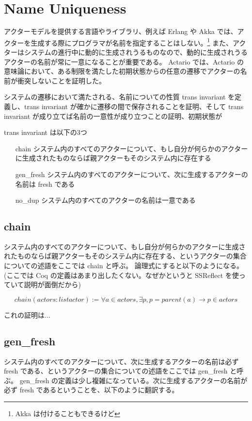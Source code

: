 \section{Name Uniqueness}
アクターモデルを提供する言語やライブラリ、例えば Erlang や Akka では、アクターを生成する際にプログラマが名前を指定することはしない。\footnote{Akka は付けることもできるけど}
また、アクターはシステムの進行中に動的に生成されうるものなので、動的に生成されうるアクターの名前が常に一意になることが重要である。
Actario では、Actario の意味論において、ある制限を満たした初期状態からの任意の遷移でアクターの名前が衝突しないことを証明した。

システムの遷移において満たされる、名前についての性質 trans invariant を定義し、trans invariant が確かに遷移の間で保存されることを証明、そして trans invariant が成り立てば名前の一意性が成り立つことの証明、初期状態が

trans invariant は以下の3つ

\begin{itemize}
\item[chain] システム内のすべてのアクターについて、もし自分が何らかのアクターに生成されたものならば親アクターもそのシステム内に存在する
\item[gen_fresh] システム内のすべてのアクターについて、次に生成するアクターの名前は fresh である
\item[no_dup] システム内のすべてのアクターの名前は一意である
\end{itemize}

\subsection{chain}
システム内のすべてのアクターについて、もし自分が何らかのアクターに生成されたものならば親アクターもそのシステム内に存在する、というアクターの集合についての述語をここでは chain と呼ぶ。
論理式にすると以下のようになる。(ここでは Coq の定義はあまり出したくない。なぜかというと SSReflect を使っていて説明が面倒だから)

\begin{equation}
  chain(actors : list actor) :=
  \forall a \in actors, \exists p, p = parent(a) \rightarrow p \in actors
\end{equation}

これの証明は...

\subsection{gen_fresh}
システム内のすべてのアクターについて、次に生成するアクターの名前は必ず fresh である、というアクターの集合についての述語をここでは gen_fresh と呼ぶ。
gen_fresh の定義は少し複雑になっている。次に生成するアクターの名前が必ず fresh であるということを、以下のように翻訳する。

